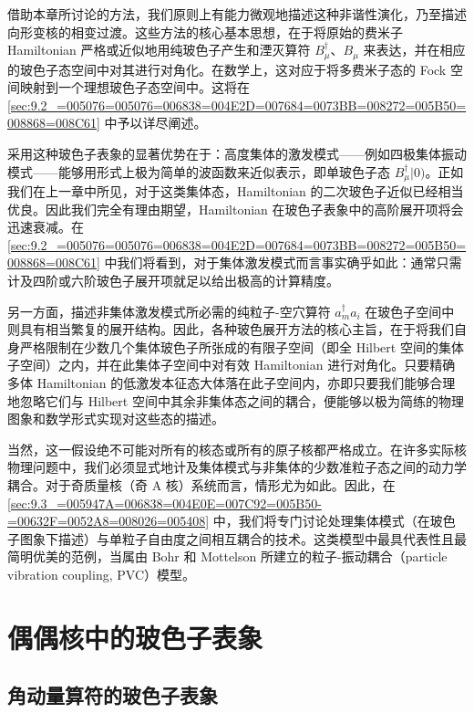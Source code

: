 借助本章所讨论的方法，我们原则上有能力微观地描述这种非谐性演化，乃至描述向形变核的相变过渡。这些方法的核心基本思想，在于将原始的费米子
Hamiltonian 严格或近似地用纯玻色子产生和湮灭算符 $B^{\dagger}_{\mu}$、$B_{\mu}$ 来表达，并在相应的玻色子态空间中对其进行对角化。在数学上，这对应于将多费米子态的
Fock 空间映射到一个理想玻色子态空间中。这将在 \ref{sec:9.2_=005076=005076=006838=004E2D=007684=0073BB=008272=005B50=008868=008C61}
中予以详尽阐述。

采用这种玻色子表象的显著优势在于：高度集体的激发模式——例如四极集体振动模式——能够用形式上极为简单的波函数来近似表示，即单玻色子态
$B^{\dagger}_{\mu}|0)$。正如我们在上一章中所见，对于这类集体态，Hamiltonian 的二次玻色子近似已经相当优良。因此我们完全有理由期望，Hamiltonian
在玻色子表象中的高阶展开项将会迅速衰减。在 \ref{sec:9.2_=005076=005076=006838=004E2D=007684=0073BB=008272=005B50=008868=008C61}
中我们将看到，对于集体激发模式而言事实确乎如此：通常只需计及四阶或六阶玻色子展开项就足以给出极高的计算精度。

另一方面，描述非集体激发模式所必需的纯粒子-空穴算符 $a^{\dagger}_{m}a_{i}$ 在玻色子空间中则具有相当繁复的展开结构。因此，各种玻色展开方法的核心主旨，在于将我们自身严格限制在少数几个集体玻色子所张成的有限子空间（即全
Hilbert 空间的集体子空间）之内，并在此集体子空间中对有效 Hamiltonian 进行对角化。只要精确多体 Hamiltonian
的低激发本征态大体落在此子空间内，亦即只要我们能够合理地忽略它们与 Hilbert 空间中其余非集体态之间的耦合，便能够以极为简练的物理图象和数学形式实现对这些态的描述。

当然，这一假设绝不可能对所有的核态或所有的原子核都严格成立。在许多实际核物理问题中，我们必须显式地计及集体模式与非集体的少数准粒子态之间的动力学耦合。对于奇质量核（奇
A 核）系统而言，情形尤为如此。因此，在 \ref{sec:9.3_=005947A=006838=004E0E=007C92=005B50-=00632F=0052A8=008026=005408}
中，我们将专门讨论处理集体模式（在玻色子图象下描述）与单粒子自由度之间相互耦合的技术。这类模型中最具代表性且最简明优美的范例，当属由
Bohr 和 Mottelson 所建立的粒子-振动耦合（particle vibration coupling, PVC）模型。

\section{偶偶核中的玻色子表象\label{sec:9.2_=005076=005076=006838=004E2D=007684=0073BB=008272=005B50=008868=008C61}}

\subsection{角动量算符的玻色子表象\label{subsec:9.2.1_=0089D2=0052A8=0091CF=007B97=007B26=007684=0073BB=008272=005B50=008868=008C61}}

